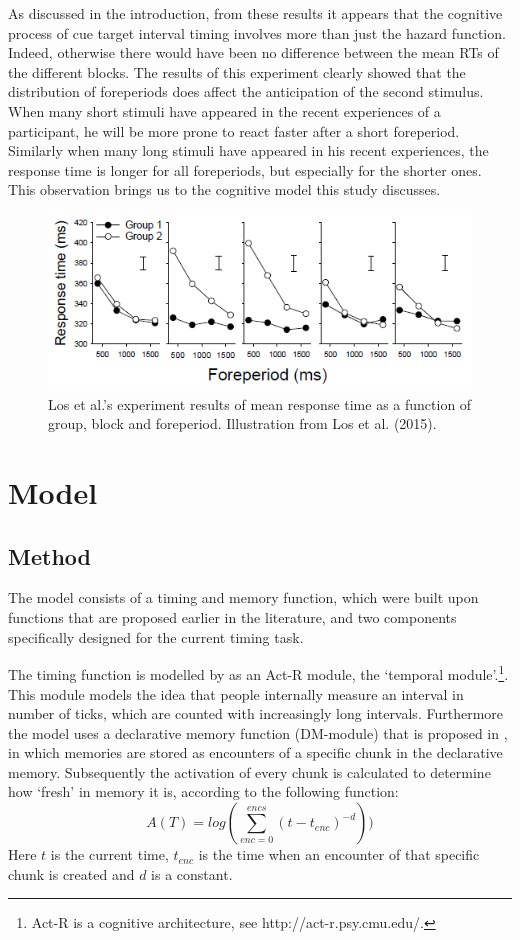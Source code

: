 \documentclass[10pt,letterpaper]{article}
\begin{document}
As discussed in the introduction, from these results it appears that the cognitive process of cue target interval timing involves more than just the hazard function. Indeed, otherwise there would have been no difference between the mean RTs of the different blocks. The results of this experiment clearly showed that the distribution of foreperiods does affect the anticipation of the second stimulus. When many short stimuli have appeared in the recent experiences of a participant, he will be more prone to react faster after a short foreperiod. Similarly when many long stimuli have appeared in his recent experiences, the response time is longer for all foreperiods, but especially for the shorter ones. This observation brings us to the cognitive model this study discusses.

\begin{figure}
	\centering
	\includegraphics[width=\columnwidth]{Los1.png}
	\caption{Los et al.'s experiment results of mean response time as a function of group, block and foreperiod. Illustration from Los et al. (2015).}
	\label{LosFigure}
\end{figure}

\section{Model}
\subsection{Method}
The model consists of a timing and memory function, which were built upon functions that are proposed earlier in the literature, and two components specifically designed for the current timing task. 

The timing function is modelled by \citet{Taatgen1} as an Act-R module, the `temporal module'.\footnote{Act-R is a cognitive architecture, see http://act-r.psy.cmu.edu/.}. This module models the idea that people internally measure an interval in number of ticks, which are counted with increasingly long intervals. Furthermore the model uses a declarative memory function (DM-module) that is proposed in \citet{Taatgen}, in which memories are stored as encounters of a specific chunk in the declarative memory. Subsequently the activation of every chunk is calculated to determine how `fresh' in memory it is, according to the following function:
\begin{equation}
	A(T) = log(\sum_{enc = 0}^{encs}(t - t_{enc})^{-d}))
\end{equation}
Here $t$ is the current time, $t_{enc}$ is the time when an encounter of that specific chunk is created and $d$ is a constant.
\end{document}

